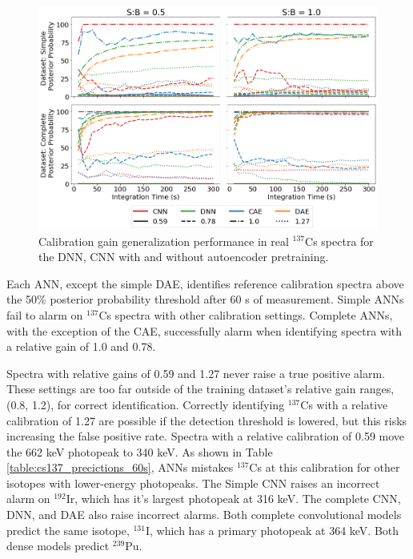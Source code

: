 \begin{figure}[H]
	\centering
	\includegraphics[width=1.0\linewidth]{images/realspectra-cal-cs137}
	\caption{Calibration gain generalization performance in real $^{137}$Cs spectra for the DNN, CNN with and without autoencoder pretraining.}
	\label{fig:realspectra-cal-cs137}
\end{figure}

Each ANN, except the simple DAE, identifies reference calibration spectra above the 50\% posterior probability threshold after 60 s of measurement. Simple ANNs fail to alarm on $^{137}$Cs spectra with other calibration settings. Complete ANNs, with the exception of the CAE, successfully alarm when identifying spectra with a relative gain of 1.0 and 0.78.

Spectra with relative gains of 0.59 and 1.27 never raise a true positive alarm. These settings are too far outside of the training dataset's relative gain ranges, (0.8, 1.2), for correct identification. Correctly identifying $^{137}$Cs with a relative calibration of 1.27 are possible if the detection threshold is lowered, but this risks increasing the false positive rate. Spectra with a relative calibration of 0.59 move the 662 keV photopeak to 340 keV. As shown in Table \ref{table:cs137_precictions_60s}, ANNs mistakes $^{137}$Cs at this calibration for other isotopes with lower-energy photopeaks. The Simple CNN raises an incorrect alarm on $^{192}$Ir, which has it's largest photopeak at 316 keV. The complete CNN, DNN, and DAE also raise incorrect alarms. Both complete convolutional models predict the same isotope, $^{131}$I, which has a primary photopeak at 364 keV. Both dense models predict $^{239}$Pu.

